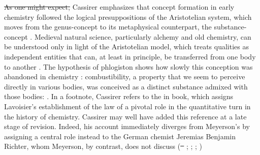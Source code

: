 \documentclass[submitted,12pt]{article}
\providecommand{\DIFadd}[1]{{\protect\color{blue}\uwave{#1}}} %
\providecommand{\DIFdel}[1]{{\protect\color{red}\sout{#1}}}                      %
\providecommand{\DIFaddbegin}{} %
\providecommand{\DIFaddend}{} %
\providecommand{\DIFdelbegin}{} %
\providecommand{\DIFdelend}{} %
\begin{document}
\DIFdelbegin \DIFdel{As one might expect, }\DIFdelend Cassirer emphasizes that concept formation in early chemistry followed the logical presuppositions of the Aristotelian system, which moves from the genus-concept  to its metaphysical counterpart, the substance-concept \origg{\SB}. Medieval natural science, particularly alchemy and old chemistry, can be understood only in light of the Aristotelian model, which treats qualities as independent entities that can, at least in principle, be transferred from one body to another . The hypothesis of phlogiston shows how slowly this conception was abandoned in chemistry : combustibility, a property that we seem to perceive directly in various bodies, was conceived as a distinct substance admixed with those bodies:  . In a footnote, Cassirer refers to the  in  book, which assigns Lavoisier's establishment of the law of  a pivotal role in the quantitative turn in the history of chemistry. Cassirer may well have added this reference at a late stage of revision. Indeed, his account immediately diverges from Meyerson's by assigning a central role instead to the German chemist Jeremias Benjamin Richter, whom Meyerson, by contrast, does not discuss (\DIFdelbegin \DIFdel{\mbox{%
\cite[see][III]{Duhem1902}}\hskip0pt%
}\DIFdelend \DIFaddbegin \DIFadd{\mbox{%
\cite[see][II.III]{Duhem1902}}\hskip0pt%
}\DIFaddend ; \cite[lect.~4]{Ladenburg1902}; \cite[I.I]{Wurtz1879}; \cite[44--49]{Ostwald1906Leitlinien})\DIFaddbegin \DIFadd{. }
\DIFaddend 
\end{document}

